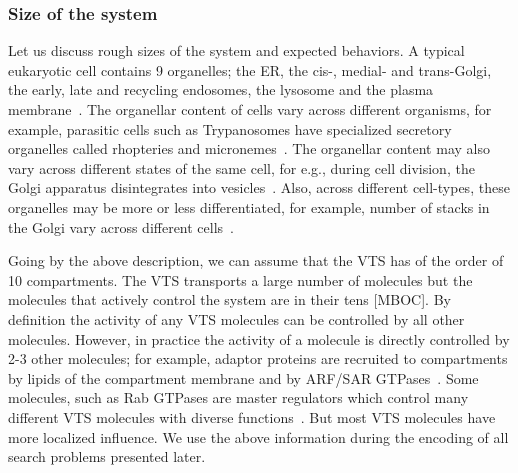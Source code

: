 \subsubsection{Size of the system}
Let us discuss rough sizes of the system and expected behaviors.
A typical eukaryotic cell contains 9 organelles; the ER, the cis-, medial- and trans-Golgi, the early, late and recycling endosomes, the lysosome and the plasma membrane~\cite{lodish2008molecular}. 
%
The organellar content of cells vary across different organisms, for example, parasitic cells such as Trypanosomes have specialized secretory organelles called rhopteries and micronemes~\cite{gubbels2012evolution}. 
%
The organellar content may also vary across different states of the same cell, for e.g., during cell division, the Golgi apparatus disintegrates into vesicles~\cite{tang2013cell}. 
%
Also, across different cell-types, these organelles may be more or less differentiated, for example, number of stacks in the Golgi vary across different cells~\cite{polishchuk2004structural}. 
%

Going by the above description, we can assume that the VTS has of the order of 10 compartments. 
%
The VTS transports a large number of molecules but the molecules that actively control the system are in their tens [MBOC]. 
%
By definition the activity of any VTS molecules can be controlled by all other molecules.
%
However, in practice the activity of a molecule is directly controlled by 2-3 other molecules; for example, adaptor proteins are recruited to compartments by lipids of the compartment membrane and by ARF/SAR GTPases~\cite{kahn2009toward}. 
%
Some molecules, such as Rab GTPases are master regulators which control many different VTS molecules with diverse functions~\cite{zerial2001rab}. 
%
But most VTS molecules have more localized influence.
%
We use the above information during the encoding of all search problems presented later.


